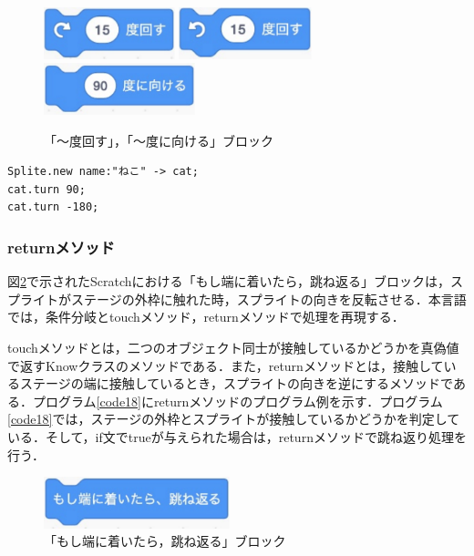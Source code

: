\documentclass[10pt,a4j]{ltjsarticle}
\begin{document}
\begin{figure}[H]
  \centering
  \includegraphics[height=15mm]{images/turn_right.pdf} 
  \includegraphics[height=15mm]{images/turn_left.pdf} 
  \includegraphics[height=15mm]{images/turn.pdf}
  \caption{「〜度回す」，「〜度に向ける」ブロック}
  \label{fig:turn}
\end{figure}

\begin{lstlisting}[caption=turnメソッドのプログラム例, label=code17]
Splite.new name:"ねこ" -> cat;
cat.turn 90;
cat.turn -180; 
\end{lstlisting}

\subsubsection{returnメソッド}
図\ref{fig:return}で示されたScratchにおける「もし端に着いたら，跳ね返る」ブロックは，スプライトがステージの外枠に触れた時，スプライトの向きを反転させる．本言語では，条件分岐とtouchメソッド，returnメソッドで処理を再現する．

touchメソッドとは，二つのオブジェクト同士が接触しているかどうかを真偽値で返すKnowクラスのメソッドである．また，returnメソッドとは，接触しているステージの端に接触しているとき，スプライトの向きを逆にするメソッドである．プログラム\ref{code18}にreturnメソッドのプログラム例を示す．プログラム\ref{code18}では，ステージの外枠とスプライトが接触しているかどうかを判定している．そして，if文でtrueが与えられた場合は，returnメソッドで跳ね返り処理を行う．

\begin{figure}[H]
  \centering
  \includegraphics[height=15mm]{images/return.pdf}
  \caption{「もし端に着いたら，跳ね返る」ブロック}
  \label{fig:return}
\end{figure}
\end{document}
